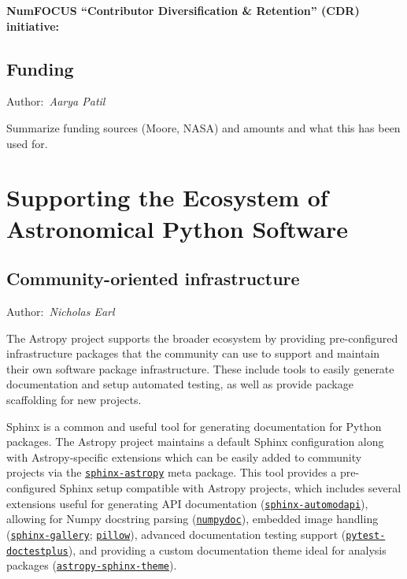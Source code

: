\documentclass[modern]{aastex631}
\newcommand{\secauthor}[1]{{\color{blue}Author:~\textit{#1}}}
\begin{document}
\textbf{NumFOCUS ``Contributor Diversification \& Retention'' (CDR)
  initiative:} 


\subsection{Funding} \label{sec:project-funding}

\secauthor{Aarya Patil}

Summarize funding sources (Moore, NASA) and amounts and what this has been used
for.


\section{Supporting the Ecosystem of Astronomical Python Software}
\label{sec:ecosystem}

\subsection{Community-oriented infrastructure}

\secauthor{Nicholas Earl}

The Astropy project supports the broader ecosystem by providing pre-configured
infrastructure packages that the community can use to support and maintain
their own software package infrastructure. These include tools to easily
generate documentation and setup automated testing, as well as provide
package scaffolding for new projects.

Sphinx is a common and useful tool for generating documentation for Python
packages. The Astropy project maintains a default Sphinx configuration along
with Astropy-specific extensions which can be easily added to community
projects via the
\href{https://github.com/astropy/sphinx-astropy}{\texttt{sphinx-astropy}} meta
package. This tool provides a pre-configured Sphinx setup compatible with
Astropy projects, which includes several extensions useful for generating API
documentation
(\href{https://github.com/astropy/sphinx-automodapi}{\texttt{sphinx-automodapi}}),
allowing for Numpy docstring parsing
(\href{https://github.com/numpy/numpydoc}{\texttt{numpydoc}}), embedded image
handling
(\href{https://github.com/sphinx-gallery/sphinx-gallery}{\texttt{sphinx-gallery}};
\href{https://github.com/python-pillow}{\texttt{pillow}}), advanced
documentation testing support
(\href{https://github.com/astropy/pytest-doctestplus}{\texttt{pytest-doctestplus}}),
and providing a custom documentation theme ideal for analysis packages
(\href{https://github.com/astropy/sphinx-astropy}{\texttt{astropy-sphinx-theme}}).
\end{document}
